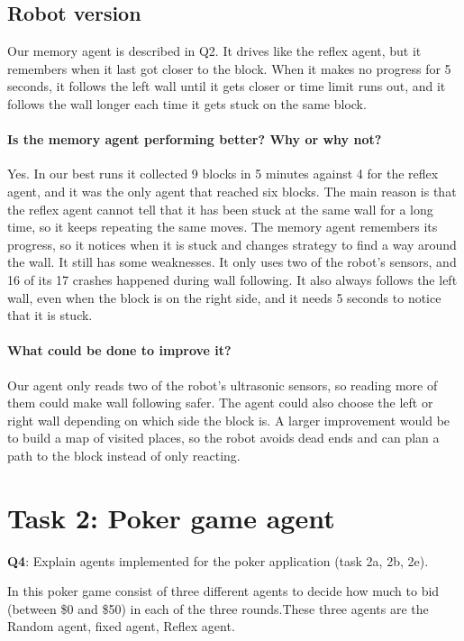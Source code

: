 \documentclass{article}
\begin{document}
\subsection*{Robot version}

Our memory agent is described in Q2. It drives like the reflex agent, but it remembers when it last got closer to the block. When it makes no progress for 5 seconds, it follows the left wall until it gets closer or time limit runs out, and it follows the wall longer each time it gets stuck on the same block.

\paragraph{Is the memory agent performing better? Why or why not?} Yes. In our best runs it collected 9 blocks in 5 minutes against 4 for the reflex agent, and it was the only agent that reached six blocks. The main reason is that the reflex agent cannot tell that it has been stuck at the same wall for a long time, so it keeps repeating the same moves. The memory agent remembers its progress, so it notices when it is stuck and changes strategy to find a way around the wall. It still has some weaknesses. It only uses two of the robot's sensors, and 16 of its 17 crashes happened during wall following. It also always follows the left wall, even when the block is on the right side, and it needs 5 seconds to notice that it is stuck.

\paragraph{What could be done to improve it?}  Our agent only reads two of the robot's ultrasonic sensors, so reading more of them could make wall following safer. The agent could also choose the left or right wall depending on which side the block is. A larger improvement would be to build a map of visited places, so the robot avoids dead ends and can plan a path to the block instead of only reacting.

\section*{Task 2: Poker game agent}

\begin{tcolorbox}
\textbf{Q4}: Explain agents implemented for the poker application (task 2a, 2b, 2e).
\end{tcolorbox}
\noindent In this poker game consist of three different agents to decide how much to bid (between \$0 and \$50) in each of the three rounds.These three agents are the Random agent, fixed agent, Reflex agent.
\end{document}
